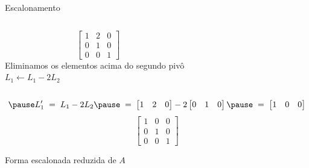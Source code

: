 \begin{resolution}{Escalonamento}
\begin{columns}
  \[\;\;\;
  \begin{bmatrix}
    1 & 2 & 0 \\
    0 & 1 & 0 \\
    0 & 0 & 1
  \end{bmatrix}
  \]
  \pause
{}
  Eliminamos os elementos acima do segundo pivô
  \\ \pause
  \(
    L_1 \leftarrow L_1 - 2 L_2
  \)
\end{columns}
\vspace{-\baselineskip}
\[
  \pause
  L'_1
  \;=\;
  L_1 - 2 L_2
  \pause
  \;=\;
  \begin{bmatrix}
    1 & 2 & 0
  \end{bmatrix}
  -2
  \begin{bmatrix}
    0 & 1 & 0
  \end{bmatrix}
  \pause
  \;=\;
  \begin{bmatrix}
    1 & 0 & 0
  \end{bmatrix}
\]
\pause
\[
  \begin{bmatrix}
    1 & 0 & 0 \\
    0 & 1 & 0 \\
    0 & 0 & 1
  \end{bmatrix}
\]

\pause
Forma escalonada reduzida de $A$
\end{resolution}

\endinput
